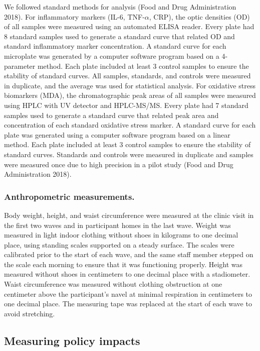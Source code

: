 \documentclass[
  letterpaper,
  DIV=11,
  numbers=noendperiod]{scrartcl}
\begin{document}
We followed standard methods for analysis (Food and Drug Administration
2018). For inflammatory markers (IL-6, TNF-\(\alpha\), CRP), the optic
densities (OD) of all samples were measured using an automated ELISA
reader. Every plate had 8 standard samples used to generate a standard
curve that related OD and standard inflammatory marker concentration. A
standard curve for each microplate was generated by a computer software
program based on a 4-parameter method. Each plate included at least 3
control samples to ensure the stability of standard curves. All samples,
standards, and controls were measured in duplicate, and the average was
used for statistical analysis. For oxidative stress biomarkers (MDA),
the chromatographic peak areas of all samples were measured using HPLC
with UV detector and HPLC-MS/MS. Every plate had 7 standard samples used
to generate a standard curve that related peak area and concentration of
each standard oxidative stress marker. A standard curve for each plate
was generated using a computer software program based on a linear
method. Each plate included at least 3 control samples to ensure the
stability of standard curves. Standards and controls were measured in
duplicate and samples were measured once due to high precision in a
pilot study (Food and Drug Administration 2018).

\subsubsection{Anthropometric
measurements.}\label{anthropometric-measurements.}

Body weight, height, and waist circumference were measured at the clinic
visit in the first two waves and in participant homes in the last wave.
Weight was measured in light indoor clothing without shoes in kilograms
to one decimal place, using standing scales supported on a steady
surface. The scales were calibrated prior to the start of each wave, and
the same staff member stepped on the scale each morning to ensure that
it was functioning properly. Height was measured without shoes in
centimeters to one decimal place with a stadiometer. Waist circumference
was measured without clothing obstruction at one centimeter above the
participant's navel at minimal respiration in centimeters to one decimal
place. The measuring tape was replaced at the start of each wave to
avoid stretching.

\subsection{Measuring policy impacts}\label{measuring-policy-impacts}
\end{document}

